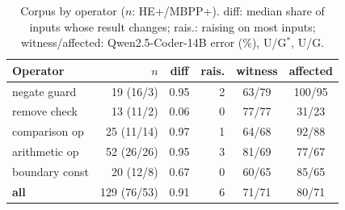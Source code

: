 \begin{table}[t]
\centering\footnotesize
\caption{Corpus by operator ($n$: HE+/MBPP+). diff: median share of inputs whose result changes; rais.: raising on most inputs; witness/affected: Qwen2.5-Coder-14B error (\%), U/G$^{*}$, U/G.}
\label{tab:corpus}
\setlength{\tabcolsep}{3pt}
\begin{tabular}{@{}lrcrcc@{}}
\toprule
Operator & $n$ & diff & rais. & witness & affected \\
\midrule
negate guard & 19 (16/3) & 0.95 & 2 & 63/79 & 100/95 \\
remove check & 13 (11/2) & 0.06 & 0 & 77/77 & 31/23 \\
comparison op & 25 (11/14) & 0.97 & 1 & 64/68 & 92/88 \\
arithmetic op & 52 (26/26) & 0.95 & 3 & 81/69 & 77/67 \\
boundary const & 20 (12/8) & 0.67 & 0 & 60/65 & 85/65 \\
\midrule
\textbf{all} & 129 (76/53) & 0.91 & 6 & 71/71 & 80/71 \\
\bottomrule
\end{tabular}
\end{table}
